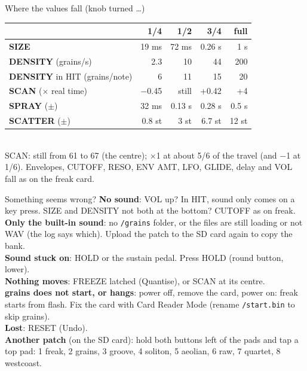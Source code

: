 \documentclass{article}
\newcommand{\GR}[1]{\textcolor{grc}{#1}}
\begin{document}
\begin{minipage}[t]{112mm}\vspace{0pt}
\begin{card}{Where the values fall (knob turned \dots)}
\fontsize{7.5}{9.2}\selectfont
\setlength{\tabcolsep}{3pt}
\begin{tabular}{@{}l r r r r@{}}
 & 1/4 & 1/2 & 3/4 & full \\ \hline
\textbf{SIZE} & 19 ms & 72 ms & 0.26 s & 1 s \\
\GR{\textbf{DENSITY}} (grains/s) & 2.3 & 10 & 44 & 200 \\
\GR{\textbf{DENSITY}} in HIT (grains/note) & 6 & 11 & 15 & 20 \\
\GR{\textbf{SCAN}} (\(\times\) real time) & \(-\)0.45 & still & +0.42 & +4 \\
\GR{\textbf{SPRAY}} (\(\pm\)) & 32 ms & 0.13 s & 0.28 s & 0.5 s \\
\GR{\textbf{SCATTER}} (\(\pm\)) & 0.8 st & 3 st & 6.7 st & 12 st \\
\end{tabular}\\[0.5mm]
SCAN: still from 61 to 67 (the centre); \(\times\)1 at about 5/6 of the travel (and \(-\)1 at 1/6).
Envelopes, CUTOFF, RESO, ENV AMT, LFO, GLIDE, delay and VOL fall as on the freak card.
\end{card}

\begin{card}{Something seems wrong?}
\fontsize{7.5}{9.2}\selectfont
\textbf{No sound}: VOL up? In HIT, sound only comes on a key press. SIZE and DENSITY not both at the bottom?
CUTOFF as on freak.\\[0.4mm]
\textbf{Only the built-in sound}: no \texttt{/grains} folder, or the files are still loading or not WAV
(the log says which). Upload the patch to the SD card again to copy the bank.\\[0.4mm]
\textbf{Sound stuck on}: HOLD or the sustain pedal. Press HOLD (round button, lower).\\[0.4mm]
\textbf{Nothing moves}: FREEZE latched (Quantise), or SCAN at its centre.\\[0.4mm]
\textbf{grains does not start, or hangs}: power off, remove the card, power on: freak starts from flash.
Fix the card with Card Reader Mode (rename \texttt{/start.bin} to skip grains).\\[0.4mm]
\textbf{Lost}: RESET (Undo).\\[0.4mm]
\textbf{Another patch} (on the SD card): hold both buttons left of the pads and tap a top pad: 1 freak, 2 grains, 3 groove, 4 soliton, 5 aeolian, 6 raw, 7 quartet, 8 westcoast.
\end{card}


\end{minipage}
\end{document}

